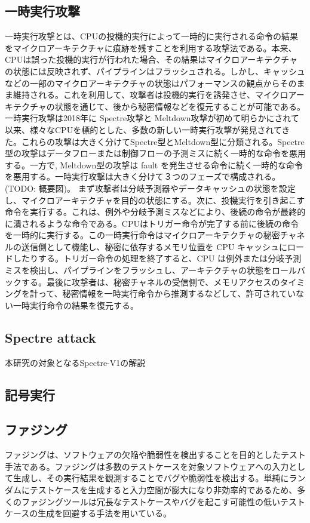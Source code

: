 \documentclass[submit]{ipsj}
\begin{document}
\subsection{一時実行攻撃}
一時実行攻撃とは、CPUの投機的実行によって一時的に実行される命令の結果をマイクロアーキテクチャに痕跡を残すことを利用する攻撃法である。本来、CPUは誤った投機的実行が行われた場合、その結果はマイクロアーキテクチャの状態には反映されず、パイプラインはフラッシュされる。しかし、キャッシュなどの一部のマイクロアーキテクチャの状態はパフォーマンスの観点からそのまま維持される。これを利用して、攻撃者は投機的実行を誘発させ、マイクロアーキテクチャの状態を通じて、後から秘密情報などを復元することが可能である。一時実行攻撃は2018年に Spectre攻撃\cite{8835233}と Meltdown攻撃\cite{217478}が初めて明らかにされて以来、様々なCPUを標的とした、多数の新しい一時実行攻撃が発見されてきた。これらの攻撃は大きく分けてSpectre型とMeltdown型に分類される\cite{canella2019systematic}。Spectre型の攻撃\cite{8835233,220586,10.1145/3243734.3243761,horn2018speculative}はデータフローまたは制御フローの予測ミスに続く一時的な命令を悪用する。一方で, Meltdown型の攻撃\cite{217478,van2018foreshadow, stecklina2018lazyfp,van2019ridl,van2020lvi}は fault を発生させる命令に続く一時的な命令を悪用する。一時実行攻撃は大きく分けて３つのフェーズで構成される。{\color{red}(TODO: 概要図)}。
まず攻撃者は分岐予測器やデータキャッシュの状態を設定し、マイクロアーキテクチャを目的の状態にする。次に、投機実行を引き起こす命令を実行する。これは、例外や分岐予測ミスなどにより、後続の命令が最終的に潰されるような命令である。CPUはトリガー命令が完了する前に後続の命令を一時的に実行する。この一時実行命令はマイクロアーキテクチャの秘密チャネルの送信側として機能し、秘密に依存するメモリ位置を CPU キャッシュにロードしたりする。トリガー命令の処理を終了すると、CPU は例外または分岐予測ミスを検出し、パイプラインをフラッシュし、アーキテクチャの状態をロールバックする。最後に攻撃者は、秘密チャネルの受信側で、メモリアクセスのタイミングを計って、秘密情報を一時実行命令から推測するなどして、許可されていない一時実行命令の結果を復元する。

\subsection{Spectre attack}
本研究の対象となるSpectre-V1の解説

\subsection{記号実行}

\subsection{ファジング}
ファジングは、ソフトウェアの欠陥や脆弱性を検出することを目的としたテスト手法である。ファジングは多数のテストケースを対象ソフトウェアへの入力として生成し、その実行結果を観測することでバグや脆弱性を検出する。単純にランダムにテストケースを生成すると入力空間が膨大になり非効率的であるため、多くのファジングツールは冗長なテストケースやバグを起こす可能性の低いテストケースの生成を回避する手法を用いている。
\end{document}

